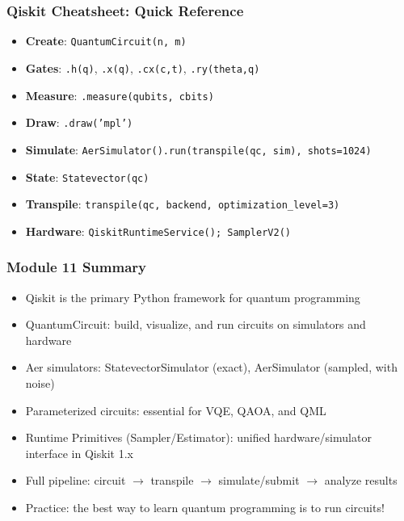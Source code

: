 \begin{frame}[fragile]\frametitle{Qiskit Cheatsheet: Quick Reference}
\begin{itemize}
\item \textbf{Create}: \texttt{QuantumCircuit(n, m)}
\item \textbf{Gates}: \texttt{.h(q)}, \texttt{.x(q)}, \texttt{.cx(c,t)}, \texttt{.ry(theta,q)}
\item \textbf{Measure}: \texttt{.measure(qubits, cbits)}
\item \textbf{Draw}: \texttt{.draw('mpl')}
\item \textbf{Simulate}: \texttt{AerSimulator().run(transpile(qc, sim), shots=1024)}
\item \textbf{State}: \texttt{Statevector(qc)}
\item \textbf{Transpile}: \texttt{transpile(qc, backend, optimization\_level=3)}
\item \textbf{Hardware}: \texttt{QiskitRuntimeService(); SamplerV2()}
\end{itemize}
\end{frame}

\begin{frame}[fragile]\frametitle{Module 11 Summary}
\begin{itemize}
\item Qiskit is the primary Python framework for quantum programming
\item QuantumCircuit: build, visualize, and run circuits on simulators and hardware
\item Aer simulators: StatevectorSimulator (exact), AerSimulator (sampled, with noise)
\item Parameterized circuits: essential for VQE, QAOA, and QML
\item Runtime Primitives (Sampler/Estimator): unified hardware/simulator interface in Qiskit 1.x
\item Full pipeline: circuit $\to$ transpile $\to$ simulate/submit $\to$ analyze results
\item Practice: the best way to learn quantum programming is to run circuits!
\end{itemize}
\end{frame}
